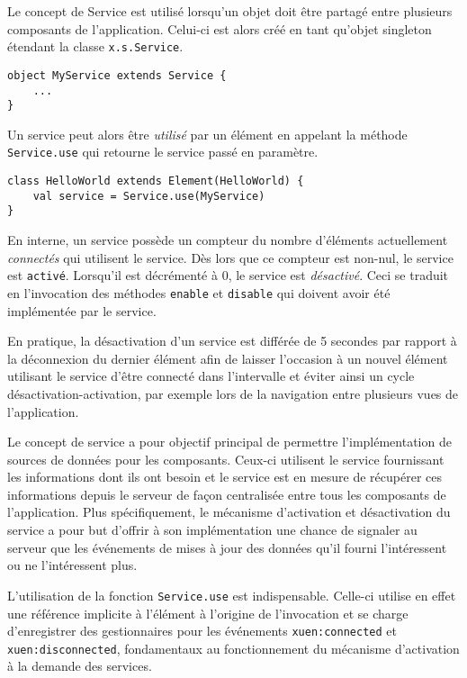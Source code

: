 Le concept de Service est utilisé lorsqu'un objet doit être partagé entre plusieurs composants de l'application. Celui-ci est alors créé en tant qu'objet singleton étendant la classe \texttt{x.s.Service}.
\begin{lstlisting}
object MyService extends Service {
	...
}
\end{lstlisting}

Un service peut alors être \emph{utilisé} par un élément en appelant la méthode \texttt{Service.use} qui retourne le service passé en paramètre.
\begin{lstlisting}
class HelloWorld extends Element(HelloWorld) {
	val service = Service.use(MyService)
}
\end{lstlisting}

En interne, un service possède un compteur du nombre d'éléments actuellement \emph{connectés} qui utilisent le service. Dès lors que ce compteur est non-nul, le service est \texttt{activé}. Lorsqu'il est décrémenté à 0, le service est \emph{désactivé}. Ceci se traduit en l'invocation des méthodes \texttt{enable} et \texttt{disable} qui doivent avoir été implémentée par le service.

En pratique, la désactivation d'un service est différée de 5 secondes par rapport à la déconnexion du dernier élément afin de laisser l'occasion à un nouvel élément utilisant le service d'être connecté dans l'intervalle et éviter ainsi un cycle désactivation-activation, par exemple lors de la navigation entre plusieurs vues de l'application.

Le concept de service a pour objectif principal de permettre l'implémentation de sources de données pour les composants. Ceux-ci utilisent le service fournissant les informations dont ils ont besoin et le service est en mesure de récupérer ces informations depuis le serveur de façon centralisée entre tous les composants de l'application. Plus spécifiquement, le mécanisme d'activation et désactivation du service a pour but d'offrir à son implémentation une chance de signaler au serveur que les événements de mises à jour des données qu'il fourni l'intéressent ou ne l'intéressent plus.

L'utilisation de la fonction \texttt{Service.use} est indispensable. Celle-ci utilise en effet une référence implicite à l'élément à l'origine de l'invocation et se charge d'enregistrer des gestionnaires pour les événements \texttt{xuen:connected} et \texttt{xuen:disconnected}, fondamentaux au fonctionnement du mécanisme d'activation à la demande des services.
